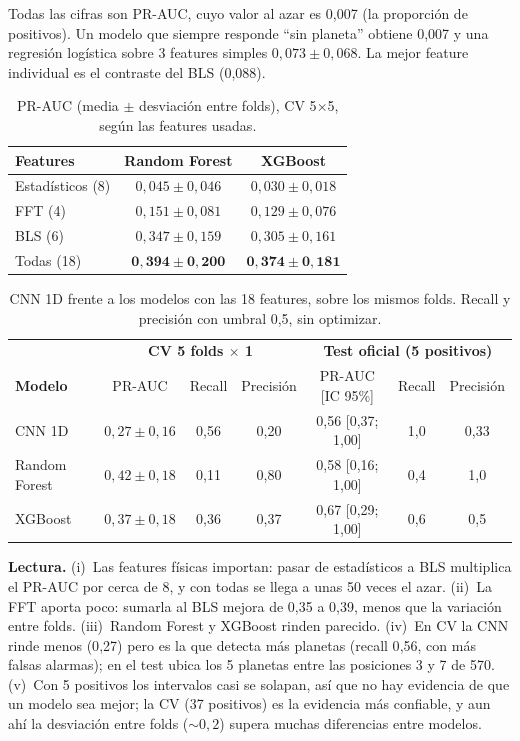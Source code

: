 \documentclass[11pt,a4paper]{article}
\begin{document}
Todas las cifras son PR-AUC, cuyo valor al azar es 0{,}007 (la proporción de
positivos). Un modelo que siempre responde ``sin planeta'' obtiene 0{,}007 y una
regresión logística sobre 3 features simples $0{,}073\pm0{,}068$. La mejor
feature individual es el contraste del BLS (0{,}088).

\begin{table}[h]
\centering
\small
\begin{tabular}{@{}lcc@{}}
\toprule
\textbf{Features} & \textbf{Random Forest} & \textbf{XGBoost}\\
\midrule
Estadísticos (8) & $0{,}045\pm0{,}046$ & $0{,}030\pm0{,}018$\\
FFT (4) & $0{,}151\pm0{,}081$ & $0{,}129\pm0{,}076$\\
BLS (6) & $0{,}347\pm0{,}159$ & $0{,}305\pm0{,}161$\\
Todas (18) & $\mathbf{0{,}394\pm0{,}200}$ & $\mathbf{0{,}374\pm0{,}181}$\\
\bottomrule
\end{tabular}
\caption{PR-AUC (media $\pm$ desviación entre folds), CV 5$\times$5, según las
features usadas.}
\label{tab:abl}
\end{table}

\begin{table}[h]
\centering
\small
\begin{tabular}{@{}lccc|ccc@{}}
\toprule
& \multicolumn{3}{c|}{\textbf{CV 5 folds $\times$ 1}} & \multicolumn{3}{c}{\textbf{Test oficial (5 positivos)}}\\
\textbf{Modelo} & PR-AUC & Recall & Precisión & PR-AUC [IC 95\%] & Recall & Precisión\\
\midrule
CNN 1D & $0{,}27\pm0{,}16$ & 0{,}56 & 0{,}20 & 0{,}56 [0{,}37; 1{,}00] & 1{,}0 & 0{,}33\\
Random Forest & $0{,}42\pm0{,}18$ & 0{,}11 & 0{,}80 & 0{,}58 [0{,}16; 1{,}00] & 0{,}4 & 1{,}0\\
XGBoost & $0{,}37\pm0{,}18$ & 0{,}36 & 0{,}37 & 0{,}67 [0{,}29; 1{,}00] & 0{,}6 & 0{,}5\\
\bottomrule
\end{tabular}
\caption{CNN 1D frente a los modelos con las 18 features, sobre los mismos folds.
Recall y precisión con umbral 0{,}5, sin optimizar.}
\label{tab:cnn}
\end{table}

\textbf{Lectura.} (i)~Las features físicas importan: pasar de estadísticos a BLS
multiplica el PR-AUC por cerca de 8, y con todas se llega a unas 50 veces el
azar. (ii)~La FFT aporta poco: sumarla al BLS mejora de 0{,}35 a 0{,}39, menos
que la variación entre folds. (iii)~Random Forest y XGBoost rinden parecido.
(iv)~En CV la CNN rinde menos (0{,}27) pero es la que detecta más planetas
(recall 0{,}56, con más falsas alarmas); en el test ubica los 5 planetas entre
las posiciones 3 y 7 de 570. (v)~Con 5 positivos los intervalos casi se
solapan, así que no hay evidencia de que un modelo sea mejor; la CV (37
positivos) es la evidencia más confiable, y aun ahí la desviación entre folds
(${\sim}0{,}2$) supera muchas diferencias entre modelos.
\end{document}
